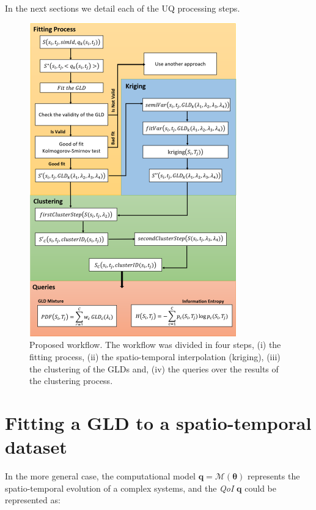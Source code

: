 In the next sections we detail each of the UQ processing steps.

\begin{figure}[H]
    \centering
    \includegraphics[width=0.8\textwidth]{img/Workflow.png}
    \caption{Proposed workflow. The workflow was divided in four steps, (i) the fitting process, (ii) the spatio-temporal interpolation (kriging), (iii) the clustering of the GLDs and, (iv) the queries over the results of the clustering process.}
    \label{fig:workflow}
\end{figure}

\section{Fitting a GLD to a spatio-temporal dataset}\label{sec:fitting}
In the more general case, the computational model $\bm{q}=\mathcal{M}(\bm{\theta})$ represents the spatio-temporal evolution of a complex systems, and the \textit{QoI} $\bm{q}$ could be represented as:  

